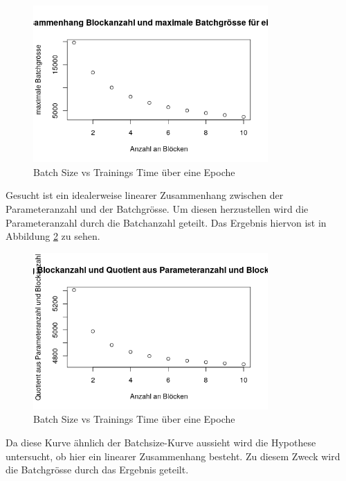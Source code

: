 \begin{figure}[h]
 \centering
 \includegraphics[width=0.8\textwidth]{KapitelPartB/Images/maxBatchSize.png}
 \caption{Batch Size vs Trainings Time über eine Epoche}
 \label{fig:maxBatchSize}
\end{figure}




Gesucht ist ein idealerweise linearer Zusammenhang zwischen der Parameteranzahl und der Batchgrösse. Um diesen herzustellen wird die Parameteranzahl durch die Batchanzahl geteilt. Das Ergebnis hiervon ist in Abbildung \ref{fig:quotient} zu sehen.

\begin{figure}[h]
 \centering
 \includegraphics[width=0.8\textwidth]{KapitelPartB/Images/quotient.png}
 \caption{Batch Size vs Trainings Time über eine Epoche}
 \label{fig:quotient}
\end{figure}


Da diese Kurve ähnlich der Batchsize-Kurve aussieht wird die Hypothese untersucht, ob hier ein linearer Zusammenhang besteht. Zu diesem Zweck wird die Batchgrösse durch das Ergebnis geteilt.

